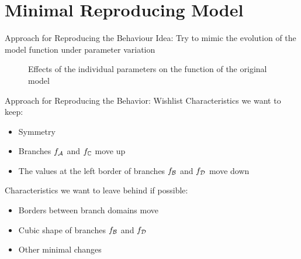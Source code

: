 
\section{Minimal Reproducing Model}

\begin{frame}{Approach for Reproducing the Behaviour}
    Idea:
    Try to mimic the evolution of the model function under parameter variation

    \vspace{-2.0em}
    \begin{figure}
        \centering
        \caption{Effects of the individual parameters on the function of the original model}
    \end{figure}
\end{frame}

\begin{frame}{Approach for Reproducing the Behavior: Wishlist}
    Characteristics we want to keep:
    \begin{itemize}
        \item Symmetry
        \item Branches $f_{\mathcal{A}}$ and $f_{\mathbb{C}}$ move up
        \item The values at the left border of branches $f_{\mathcal{B}}$ and $f_{\mathcal{D}}$ move down
    \end{itemize}

    \vspace{2em}
    Characteristics we want to leave behind if possible:
    \begin{itemize}
        \item Borders between branch domains move
        \item Cubic shape of branches $f_{\mathcal{B}}$ and $f_{\mathcal{D}}$
        \item Other minimal changes
    \end{itemize}
\end{frame}

